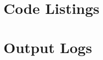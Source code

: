 \documentclass[a4paper,titlepage]{article}
\begin{document}
	\onecolumn
	
	\begin{appendices}
		
		\section{Code Listings} \label{appendix:code}
		
		
		
		\section{Output Logs} \label{appendix:logs}
		

	\end{appendices}
\end{document}
